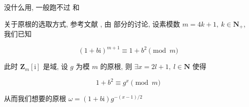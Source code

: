 没什么用, 一般跑不过  和 

关于原根的选取方式, 参考文献 \cite{ieee1451721}, 由  部分的讨论, 设素模数 \(m=4k+1,~k\in\mathbf{N}_+\), 我们已知

\[
    \left(1+b\mathrm{i}\right)^{m+1}\equiv 1+b^2\pmod m
\]

此时 \(\mathbf{Z}_m\left[\mathrm{i}\right]\) 是域, 设 \(g\) 为模 \(m\) 的原根, 则 \(\exists x=2l+1,~l\in\mathbf{N}\) 使得

\[
    1+b^2\equiv g^x\pmod m
\]

从而我们想要的原根 \(\omega=\left(1+b\mathrm{i}\right)g^{-(x-1)/2}\)
